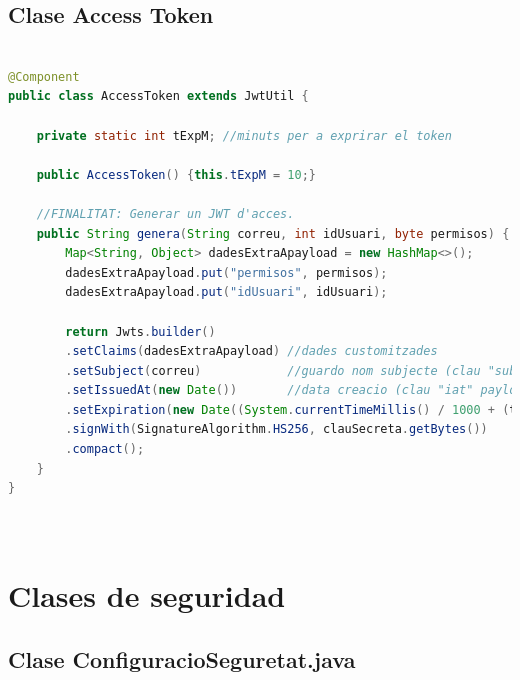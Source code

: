 \documentclass[a4paper,12pt]{report}
\begin{document}
\subsection{Clase Access Token}
\begin{lstlisting}[language=Java, basicstyle=\ttfamily\tiny, keywordstyle=\color{magenta}]

@Component
public class AccessToken extends JwtUtil {
	
	private static int tExpM; //minuts per a exprirar el token
	
	public AccessToken() {this.tExpM = 10;}
	
	//FINALITAT: Generar un JWT d'acces.
	public String genera(String correu, int idUsuari, byte permisos) {
		Map<String, Object> dadesExtraApayload = new HashMap<>();
		dadesExtraApayload.put("permisos", permisos);
		dadesExtraApayload.put("idUsuari", idUsuari);
		
		return Jwts.builder()
		.setClaims(dadesExtraApayload) //dades customitzades
		.setSubject(correu)            //guardo nom subjecte (clau "sub")
		.setIssuedAt(new Date())       //data creacio (clau "iat" payload)
		.setExpiration(new Date((System.currentTimeMillis() / 1000 + (tExpM * 60)) * 1000))
		.signWith(SignatureAlgorithm.HS256, clauSecreta.getBytes())
		.compact();
	}
}
	
				
\end{lstlisting}
	
		\section{Clases de seguridad}
		
		\subsection{Clase ConfiguracioSeguretat.java}
		\label{sec:anexoConfiguracioSeguretat}
		
\end{document}
